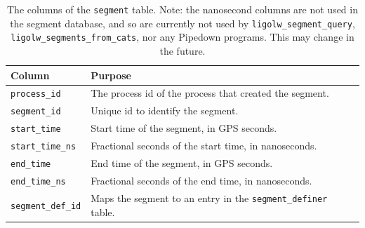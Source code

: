\begin{table}[p]
\label{tab:segment}
\center
\begin{tabular}{ l | p{10cm}}
Column      &   Purpose     \\
\hline \hline
\texttt{process\_id}    &   The process id of the process that created the segment. \\
\hline
\texttt{segment\_id}    &   Unique id to identify the segment. \\
\hline
\texttt{start\_time}    &   Start time of the segment, in GPS seconds. \\
\hline
\texttt{start\_time\_ns}    &   Fractional seconds of the start time, in nanoseconds. \\
\hline
\texttt{end\_time}  &   End time of the segment, in GPS seconds. \\
\hline
\texttt{end\_time\_ns}  &   Fractional seconds of the end time, in nanoseconds. \\
\hline
\texttt{segment\_def\_id}   &   Maps the segment to an entry in the \texttt{segment\_definer} table.
\end{tabular}
\caption{The columns of the \texttt{segment} table. Note: the nanosecond columns are not used in the segment database, and so are currently not used by \texttt{ligolw\_segment\_query}, \texttt{ligolw\_segments\_from\_cats}, nor any Pipedown programs. This may change in the future.}
\end{table}

